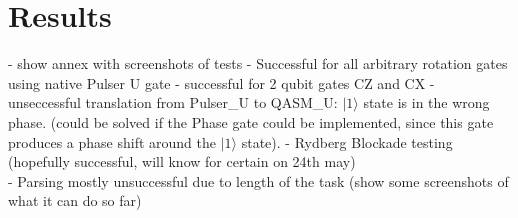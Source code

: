 \section{Results}
- show annex with screenshots of tests
- Successful for all arbitrary rotation gates using native Pulser U gate
- successful for 2 qubit gates CZ and CX
- unseccessful translation from Pulser\_U to QASM\_U: $|1 \rangle$ state is in the wrong phase. (could be solved if the Phase gate could be implemented, since this gate produces a phase shift around the $|1 \rangle$ state).
- Rydberg Blockade testing (hopefully successful, will know for certain on 24th may)\\
- Parsing mostly unsuccessful due to length of the task (show some screenshots of what it can do so far)